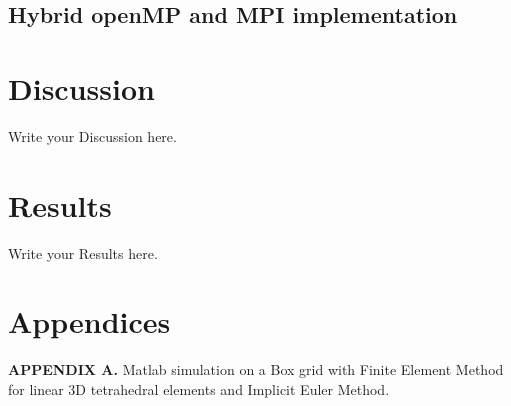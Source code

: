 \documentclass[12pt]{article}
\begin{document}
\subsection{Hybrid openMP and MPI implementation}


	
	\section{Discussion}
	Write your Discussion here.	
	
	\section{Results}
	Write your Results here.
	
	
	\section{Appendices}
	
	\textbf{APPENDIX A.} Matlab simulation on a Box grid with Finite Element Method for linear 3D tetrahedral elements and Implicit Euler Method.
	
\end{document}
